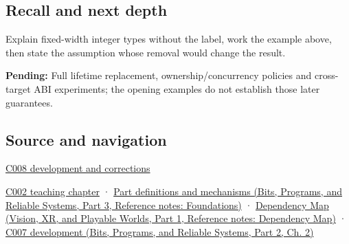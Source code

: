 \subsection{Recall and next depth}\label{appendix-cc04044b5782-recall-and-next-depth}

\hypertarget{appendix-cc04044b5782-recall-and-next-depth}{}

Explain fixed-width integer types without the label, work the example above, then state the assumption whose removal would change the result.

\textbf{Pending:} Full lifetime replacement, ownership/concurrency policies and cross-target ABI experiments; the opening examples do not establish those later guarantees.

\subsection{Source and navigation}\label{appendix-cc04044b5782-source-and-navigation}

\hypertarget{appendix-cc04044b5782-source-and-navigation}{}

\hyperref[appendix-fd090d982a15-m008---parts-113-126]{C008 development and corrections}

\hyperref[01-foundations-i-ch001-arithmetic-becomes-a-policy]{C002 teaching chapter} · \href{../01-Bits-Programs-and-Reliable-Systems-P03/main.pdf\#appendix-fd090d982a15}{Part definitions and mechanisms (Bits, Programs, and Reliable Systems, Part 3, Reference notes: Foundations)} · \href{../07-Vision-XR-and-Playable-Worlds-P01/main.pdf\#appendix-4ad47bdd269a}{Dependency Map (Vision, XR, and Playable Worlds, Part 1, Reference notes: Dependency Map)} · \href{../01-Bits-Programs-and-Reliable-Systems-P02/main.pdf\#01-foundations-i-ch002-choose-a-type-for-its-promise-not-its-familiar-size}{C007 development (Bits, Programs, and Reliable Systems, Part 2, Ch. 2)}
